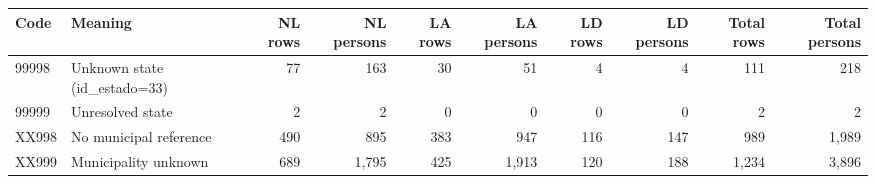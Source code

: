 \begin{tabular}{llrrrrrrrr}
\toprule
Code & Meaning & NL rows & NL persons & LA rows & LA persons & LD rows & LD persons & Total rows & Total persons \\
\midrule
99998 & Unknown state (id\_estado=33) & 77 & 163 & 30 & 51 & 4 & 4 & 111 & 218 \\
99999 & Unresolved state & 2 & 2 & 0 & 0 & 0 & 0 & 2 & 2 \\
XX998 & No municipal reference & 490 & 895 & 383 & 947 & 116 & 147 & 989 & 1,989 \\
XX999 & Municipality unknown & 689 & 1,795 & 425 & 1,913 & 120 & 188 & 1,234 & 3,896 \\
\bottomrule
\end{tabular}
